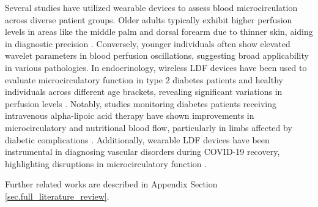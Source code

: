 Several studies have utilized wearable devices to assess blood microcirculation across diverse patient groups. Older adults typically exhibit higher perfusion levels in areas like the middle palm and dorsal forearm due to thinner skin, aiding in diagnostic precision \cite{Loktionova:19}. Conversely, younger individuals often show elevated wavelet parameters in blood perfusion oscillations, suggesting broad applicability in various pathologies. In endocrinology, wireless LDF devices have been used to evaluate microcirculatory function in type 2 diabetes patients and healthy individuals across different age brackets, revealing significant variations in perfusion levels \cite{Zherebtsov:19}. Notably, studies monitoring diabetes patients receiving intravenous alpha-lipoic acid therapy have shown improvements in microcirculatory and nutritional blood flow, particularly in limbs affected by diabetic complications \cite{article2022}. Additionally, wearable LDF devices have been instrumental in diagnosing vascular disorders during COVID-19 recovery, highlighting disruptions in microcirculatory function \cite{diagnostics13050920}.

Further related works are described in Appendix Section \ref{sec.full_literature_review}.